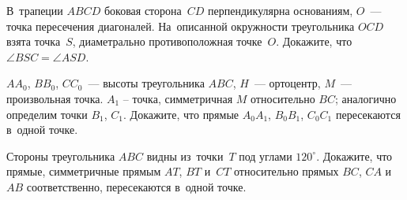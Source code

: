 \begin{problems}
\item
В~трапеции $ABCD$ боковая сторона~$CD$ перпендикулярна основаниям,
$O$~--- точка пересечения диагоналей.
На~описанной окружности треугольника $OCD$ взята точка~$S$, диаметрально
противоположная точке~$O$.
Докажите, что $\angle BSC = \angle ASD$.

\item
$AA_{0}$, $BB_{0}$, $CC_{0}$~--- высоты треугольника $ABC$,
$H$~--- ортоцентр,
$M$~--- произвольная точка.
$A_{1}$ -- точка, симметричная $M$ относительно $BC$;
аналогично определим точки $B_{1}$, $C_{1}$.
Докажите, что прямые $A_{0}A_{1}$, $B_{0}B_{1}$, $C_{0}C_{1}$ пересекаются
в~одной точке.

\item
Стороны треугольника $ABC$ видны из~точки~$T$ под углами $120^{\circ}$.
Докажите, что прямые, симметричные прямым $AT$, $BT$ и~$CT$ относительно
прямых $BC$, $CA$ и~$AB$ соответственно, пересекаются в~одной точке.

\end{problems}

